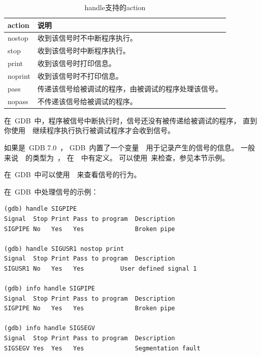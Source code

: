 \noindent
{}


\begin{table}[!bhp]
\begin{tabularx}{400pt}{l|X}
\hline
\hline
action	& 说明 \\
\hline
nostop  & 收到该信号时不中断程序执行。\\
stop    & 收到该信号时中断程序执行。\\
print   & 收到该信号时打印信息。\\
noprint & 收到该信号时不打印信息。\\
pass    & 传递该信号给被调试的程序，由被调试的程序处理该信号。\\
nopass  & 不传递该信号给被调试的程序。\\
\hline
\hline
\end{tabularx}
\caption{handle支持的action} \label{tab:signal_actions}
\end{table}

在~GDB~中，程序被信号中断执行时，信号还没有被传递给被调试的程序，
直到你使用~~继续程序执行执行被调试程序才会收到信号。

如果是~GDB 7.0~，
GDB~内置了一个变量~~用于记录产生的信号的信息。
一般来说~~的类型为~，
在~~中有定义。
可以使用~来检查，参见本节示例。

在~GDB~中可以使用~~来查看信号的行为。

\noindent
{}


在~GDB~中处理信号的示例：
\begin{lstlisting}
(gdb) handle SIGPIPE
Signal  Stop Print Pass to program  Description
SIGPIPE No   Yes   Yes              Broken pipe

(gdb) handle SIGUSR1 nostop print
Signal  Stop Print Pass to program  Description
SIGUSR1 No   Yes   Yes		    User defined signal 1

(gdb) info handle SIGPIPE
Signal  Stop Print Pass to program  Description
SIGPIPE No   Yes   Yes              Broken pipe

(gdb) info handle SIGSEGV
Signal  Stop Print Pass to program  Description
SIGSEGV Yes  Yes   Yes              Segmentation fault
\end{lstlisting}

